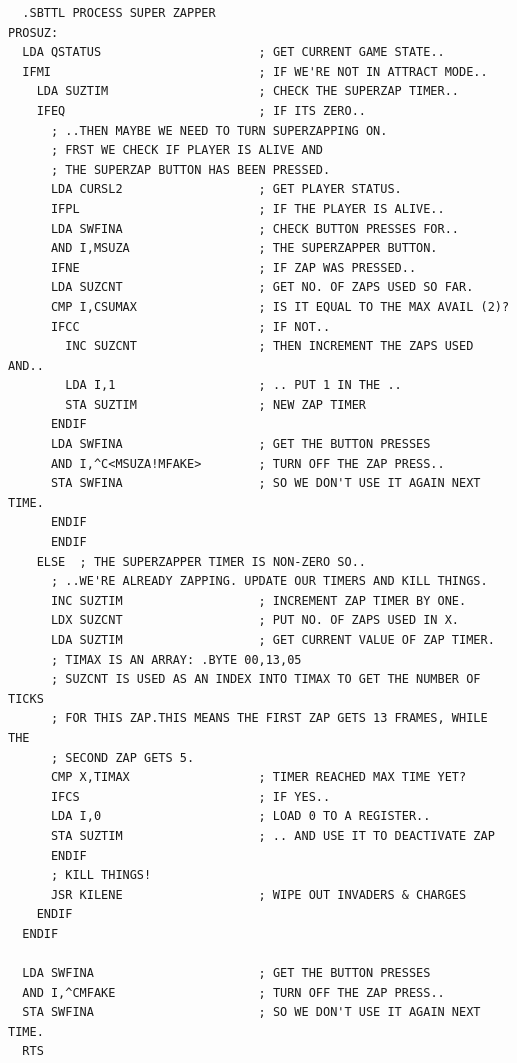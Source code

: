 \clearpage
\begin{lstlisting}
  .SBTTL PROCESS SUPER ZAPPER
PROSUZ:
  LDA QSTATUS                      ; GET CURRENT GAME STATE..
  IFMI                             ; IF WE'RE NOT IN ATTRACT MODE..
    LDA SUZTIM                     ; CHECK THE SUPERZAP TIMER..
    IFEQ                           ; IF ITS ZERO..
      ; ..THEN MAYBE WE NEED TO TURN SUPERZAPPING ON.
      ; FRST WE CHECK IF PLAYER IS ALIVE AND
      ; THE SUPERZAP BUTTON HAS BEEN PRESSED.
      LDA CURSL2                   ; GET PLAYER STATUS.
      IFPL                         ; IF THE PLAYER IS ALIVE..
      LDA SWFINA                   ; CHECK BUTTON PRESSES FOR..
      AND I,MSUZA                  ; THE SUPERZAPPER BUTTON.
      IFNE                         ; IF ZAP WAS PRESSED..
      LDA SUZCNT                   ; GET NO. OF ZAPS USED SO FAR.
      CMP I,CSUMAX                 ; IS IT EQUAL TO THE MAX AVAIL (2)?
      IFCC                         ; IF NOT..
        INC SUZCNT                 ; THEN INCREMENT THE ZAPS USED AND..
        LDA I,1                    ; .. PUT 1 IN THE ..
        STA SUZTIM                 ; NEW ZAP TIMER
      ENDIF
      LDA SWFINA                   ; GET THE BUTTON PRESSES
      AND I,^C<MSUZA!MFAKE>        ; TURN OFF THE ZAP PRESS..
      STA SWFINA                   ; SO WE DON'T USE IT AGAIN NEXT TIME.
      ENDIF
      ENDIF
    ELSE  ; THE SUPERZAPPER TIMER IS NON-ZERO SO.. 
      ; ..WE'RE ALREADY ZAPPING. UPDATE OUR TIMERS AND KILL THINGS.
      INC SUZTIM                   ; INCREMENT ZAP TIMER BY ONE.
      LDX SUZCNT                   ; PUT NO. OF ZAPS USED IN X.
      LDA SUZTIM                   ; GET CURRENT VALUE OF ZAP TIMER.
      ; TIMAX IS AN ARRAY: .BYTE 00,13,05
      ; SUZCNT IS USED AS AN INDEX INTO TIMAX TO GET THE NUMBER OF TICKS
      ; FOR THIS ZAP.THIS MEANS THE FIRST ZAP GETS 13 FRAMES, WHILE THE
      ; SECOND ZAP GETS 5.
      CMP X,TIMAX                  ; TIMER REACHED MAX TIME YET?
      IFCS                         ; IF YES..
      LDA I,0                      ; LOAD 0 TO A REGISTER..
      STA SUZTIM                   ; .. AND USE IT TO DEACTIVATE ZAP
      ENDIF
      ; KILL THINGS!
      JSR KILENE                   ; WIPE OUT INVADERS & CHARGES
    ENDIF
  ENDIF
    
  LDA SWFINA                       ; GET THE BUTTON PRESSES
  AND I,^CMFAKE                    ; TURN OFF THE ZAP PRESS..
  STA SWFINA                       ; SO WE DON'T USE IT AGAIN NEXT TIME.
  RTS
\end{lstlisting}
\clearpage

